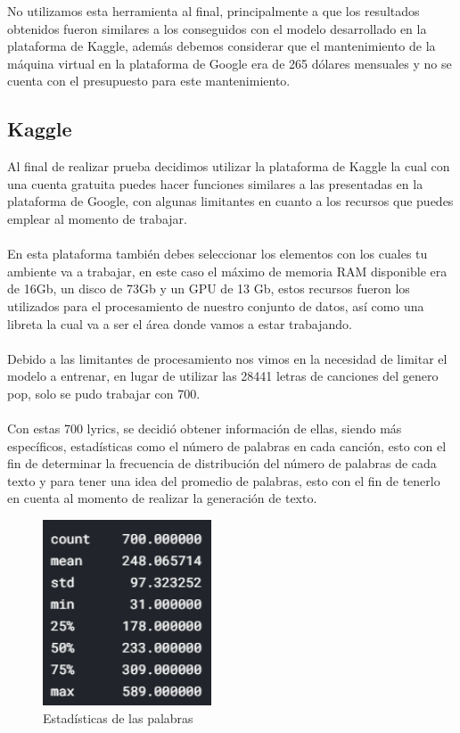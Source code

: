 \documentclass[12pt, a4paper, titlepage]{report}
\begin{document}
No utilizamos esta herramienta al final, principalmente a que los resultados obtenidos fueron similares a los conseguidos con el modelo desarrollado en la plataforma de Kaggle, además debemos considerar que el mantenimiento de la máquina virtual en la plataforma de Google era de 265 dólares mensuales y no se cuenta con el presupuesto para este mantenimiento.

\subsection{Kaggle}

Al final de realizar prueba decidimos utilizar la plataforma de Kaggle la cual con una cuenta gratuita puedes hacer funciones similares a las presentadas en la plataforma de Google, con algunas limitantes en cuanto a los recursos que puedes emplear al momento de trabajar.\\\\
En esta plataforma también debes seleccionar los elementos con los cuales tu ambiente va a trabajar, en este caso el máximo de memoria RAM disponible era de 16Gb, un disco de 73Gb y un GPU de 13 Gb, estos recursos fueron los utilizados para el procesamiento de nuestro conjunto de datos, así como una libreta la cual va a ser el área donde vamos a estar trabajando.\\\\
Debido a las limitantes de procesamiento nos vimos en la necesidad de limitar el modelo a entrenar, en lugar de utilizar las 28441 letras de canciones del genero pop, solo se pudo trabajar con 700.\\\\
Con estas 700 lyrics, se decidió obtener información de ellas, siendo más específicos, estadísticas como el número de palabras en cada canción, esto con el fin de determinar la frecuencia de distribución del número de palabras de cada texto y para tener una idea del promedio de palabras, esto con el fin de tenerlo en cuenta al momento de realizar la generación de texto.
	\begin{figure}[H]
	\includegraphics[width=5cm]{./imagenes/Desarrollo/Kaggle/estadistica.png}
	\centering 
	\caption{Estadísticas de las palabras}
\end{figure}
\end{document}
